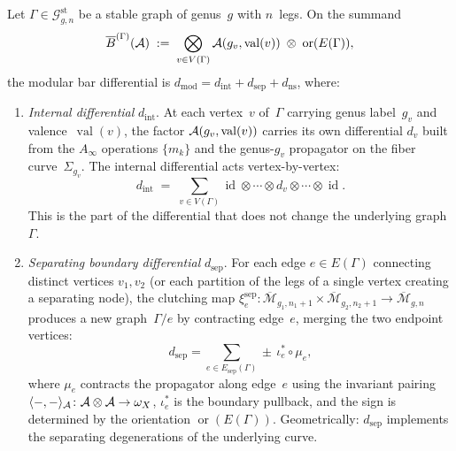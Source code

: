 \begin{definition}
\label{def:three-component-modular-bar}
Let $\Gamma \in \mathcal{G}^{\mathrm{st}}_{g,n}$ be a stable graph
of genus~$g$ with $n$~legs.  On the summand
\[
\overline{B}^{(\Gamma)}(\mathcal{A})
\;:=\;
\bigotimes_{v \in V(\Gamma)} \mathcal{A}(g_v, \operatorname{val}(v))
\;\otimes\; \operatorname{or}(E(\Gamma)),
\]
the modular bar differential is
$d_{\mathrm{mod}} = d_{\mathrm{int}} + d_{\mathrm{sep}} + d_{\mathrm{ns}}$,
where:
\begin{enumerate}[label=\textup{(\roman*)}]
\item \emph{Internal differential} $d_{\mathrm{int}}$.
  At each vertex~$v$ of~$\Gamma$ carrying genus label~$g_v$ and
  valence~$\operatorname{val}(v)$, the factor
  $\mathcal{A}(g_v, \operatorname{val}(v))$ carries its own differential
  $d_v$ built from the $A_\infty$ operations $\{m_k\}$ and the
  genus-$g_v$ propagator on the fiber curve~$\Sigma_{g_v}$.
  The internal differential acts vertex-by-vertex:
  \begin{equation}\label{eq:d-int}
  d_{\mathrm{int}}
  \;=\;
  \sum_{v \in V(\Gamma)}
  \operatorname{id} \otimes \cdots \otimes d_v
  \otimes \cdots \otimes \operatorname{id}.
  \end{equation}
  This is the part of the differential that does not change the
  underlying graph~$\Gamma$.

\item \emph{Separating boundary differential} $d_{\mathrm{sep}}$.
  For each edge $e \in E(\Gamma)$ connecting distinct vertices
  $v_1, v_2$ (or each partition of the legs of a single vertex
  creating a separating node), the clutching map
  $\xi_{e}^{\mathrm{sep}}\colon
  \overline{\mathcal{M}}_{g_1, n_1+1} \times
  \overline{\mathcal{M}}_{g_2, n_2+1} \to
  \overline{\mathcal{M}}_{g, n}$
  produces a new graph~$\Gamma/e$ by contracting edge~$e$,
  merging the two endpoint vertices:
  \begin{equation}\label{eq:d-sep}
  d_{\mathrm{sep}} = \sum_{e \in E_{\mathrm{sep}}(\Gamma)}
  \pm\, \iota_e^* \circ \mu_e,
  \end{equation}
  where $\mu_e$ contracts the propagator along edge~$e$ using the
  invariant pairing
  $\langle -, - \rangle_{\mathcal{A}}\colon \mathcal{A} \otimes \mathcal{A} \to \omega_X$,
  $\iota_e^*$ is the boundary pullback, and the sign is determined
  by the orientation $\operatorname{or}(E(\Gamma))$.
  Geometrically: $d_{\mathrm{sep}}$ implements the separating
  degenerations of the underlying curve.


\end{enumerate}
\end{definition}
